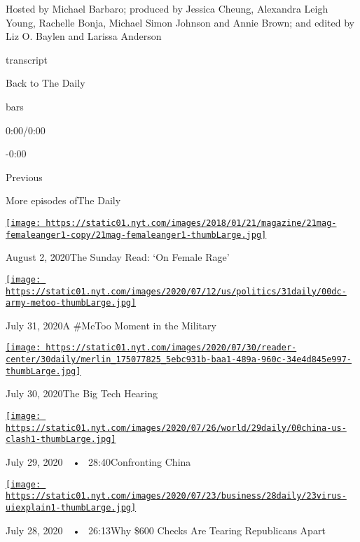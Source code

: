 Hosted by Michael Barbaro; produced by Jessica Cheung, Alexandra Leigh
Young, Rachelle Bonja, Michael Simon Johnson and Annie Brown; and edited
by Liz O. Baylen and Larissa Anderson

transcript

Back to The Daily

bars

0:00/0:00

-0:00

Previous

More episodes ofThe Daily

\href{https://www.nytimes.com/2020/08/02/podcasts/the-daily/on-female-rage.html?action=click\&module=audio-series-bar\&region=header\&pgtype=Article}{\texttt{[image: https://static01.nyt.com/images/2018/01/21/magazine/21mag-femaleanger1-copy/21mag-femaleanger1-thumbLarge.jpg]}}

August 2, 2020The Sunday Read: `On Female Rage'

\href{https://www.nytimes.com/2020/07/31/podcasts/the-daily/vanessa-guillen-military-metoo.html?action=click\&module=audio-series-bar\&region=header\&pgtype=Article}{\texttt{[image: https://static01.nyt.com/images/2020/07/12/us/politics/31daily/00dc-army-metoo-thumbLarge.jpg]}}

July 31, 2020A \#MeToo Moment in the Military

\href{https://www.nytimes.com/2020/07/30/podcasts/the-daily/congress-facebook-amazon-google-apple.html?action=click\&module=audio-series-bar\&region=header\&pgtype=Article}{\texttt{[image: https://static01.nyt.com/images/2020/07/30/reader-center/30daily/merlin\_175077825\_5ebc931b-baa1-489a-960c-34e4d845e997-thumbLarge.jpg]}}

July 30, 2020The Big Tech Hearing

\href{https://www.nytimes.com/2020/07/29/podcasts/the-daily/china-trump-foreign-policy.html?action=click\&module=audio-series-bar\&region=header\&pgtype=Article}{\texttt{[image: https://static01.nyt.com/images/2020/07/26/world/29daily/00china-us-clash1-thumbLarge.jpg]}}

July 29, 2020~~•~ 28:40Confronting China

\href{https://www.nytimes.com/2020/07/28/podcasts/the-daily/unemployment-benefits-coronavirus.html?action=click\&module=audio-series-bar\&region=header\&pgtype=Article}{\texttt{[image: https://static01.nyt.com/images/2020/07/23/business/28daily/23virus-uiexplain1-thumbLarge.jpg]}}

July 28, 2020~~•~ 26:13Why \$600 Checks Are Tearing Republicans Apart

